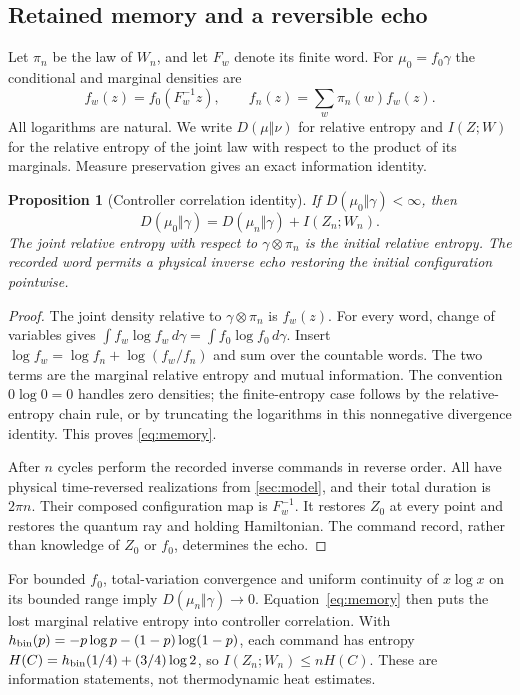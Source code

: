 \documentclass[11pt]{article}
\numberwithin{equation}{section}
\newtheorem{proposition}[proposition]{Proposition}
\theoremstyle{definition}
\begin{document}
\subsection{Retained memory and a reversible echo}
Let $\pi_n$ be the law of $W_n$, and let $F_w$ denote its finite word. For $\mu_0=f_0\gamma$ the conditional and marginal densities are
\[
 f_w(z)=f_0(F_w^{-1}z),\qquad
 f_n(z)=\sum_w\pi_n(w)f_w(z).
\]
All logarithms are natural. We write $D(\mu\Vert\nu)$ for relative entropy and $I(Z;W)$ for the relative entropy of the joint law with respect to the product of its marginals. Measure preservation gives an exact information identity.
\begin{proposition}[Controller correlation identity]\label{prop:memory}
If $D(\mu_0\Vert\gamma)<\infty$, then
\begin{equation}\label{eq:memory}
 D(\mu_0\Vert\gamma)
 =D(\mu_n\Vert\gamma)+I(Z_n;W_n).
\end{equation}
The joint relative entropy with respect to $\gamma\otimes\pi_n$ is the initial relative entropy. The recorded word permits a physical inverse echo restoring the initial configuration pointwise.
\end{proposition}
\begin{proof}
The joint density relative to $\gamma\otimes\pi_n$ is $f_w(z)$. For every word, change of variables gives
$\int f_w\log f_w\,d\gamma=\int f_0\log f_0\,d\gamma$.
Insert $\log f_w=\log f_n+\log(f_w/f_n)$ and sum over the countable words. The two terms are the marginal relative entropy and mutual information. The convention $0\log0=0$ handles zero densities; the finite-entropy case follows by the relative-entropy chain rule, or by truncating the logarithms in this nonnegative divergence identity. This proves \eqref{eq:memory}.

After $n$ cycles perform the recorded inverse commands in reverse order. All have physical time-reversed realizations from \cref{sec:model}, and their total duration is $2\pi n$. Their composed configuration map is $F_w^{-1}$. It restores $Z_0$ at every point and restores the quantum ray and holding Hamiltonian. The command record, rather than knowledge of $Z_0$ or $f_0$, determines the echo.
\end{proof}

For bounded $f_0$, total-variation convergence and uniform continuity of $x\log x$ on its bounded range imply $D(\mu_n\Vert\gamma)\to0$. Equation~\eqref{eq:memory} then puts the lost marginal relative entropy into controller correlation. With $h_{\rm bin}(p)=-p\log p-(1-p)\log(1-p)$, each command has entropy $H(C)=h_{\rm bin}(1/4)+(3/4)\log2$, so $I(Z_n;W_n)\le nH(C)$. These are information statements, not thermodynamic heat estimates.
\end{document}

